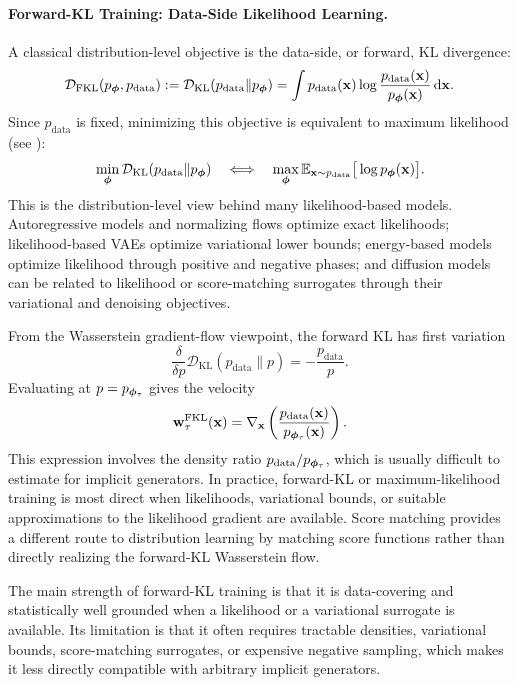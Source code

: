 \paragraph{Forward-KL Training: Data-Side Likelihood Learning.}
A classical distribution-level objective is the data-side, or forward, KL
divergence:
\[
    \mathcal{D}_{\mathrm{FKL}}(p_{{\bm{\phi}}},p_{\mathrm{data}})
    :=
    \mathcal D_{\mathrm{KL}}(p_{\mathrm{data}}\|p_{{\bm{\phi}}})
    =
    \int
    p_{\mathrm{data}}({\mathbf{x}})
    \log
    \frac{p_{\mathrm{data}}({\mathbf{x}})}{p_{{\bm{\phi}}}({\mathbf{x}})}
    \mathop{}\!\mathrm{d}{\mathbf{x}}.
\]
Since $p_{\mathrm{data}}$ is fixed, minimizing this objective is equivalent to
maximum likelihood (see ):
\[
    \min_{{\bm{\phi}}}
    \mathcal D_{\mathrm{KL}}(p_{\mathrm{data}}\|p_{{\bm{\phi}}})
    \quad
    \Longleftrightarrow
    \quad
    \max_{{\bm{\phi}}}
    \mathbb{E}_{{\mathbf{x}}\sim p_{\mathrm{data}}}
    \big[
        \log p_{{\bm{\phi}}}({\mathbf{x}})
    \big].
\]
This is the distribution-level view behind many likelihood-based models.
Autoregressive models and normalizing flows optimize exact likelihoods;
likelihood-based VAEs optimize variational lower bounds; energy-based models
optimize likelihood through positive and negative phases; and diffusion models
can be related to likelihood or score-matching surrogates through their
variational and denoising objectives.

From the Wasserstein gradient-flow viewpoint, the forward KL has first
variation
\[
    \frac{\delta}{\delta p}
    \mathcal D_{\mathrm{KL}}(p_{\mathrm{data}}\|p)
    =
    -
    \frac{p_{\mathrm{data}}}{p}.
\]
Evaluating at $p=p_{{\bm{\phi}}_\tau}$ gives the velocity
\[
    {\mathbf{w}}_\tau^{\mathrm{FKL}}({\mathbf{x}})
    =
    \nabla_{{\mathbf{x}}}
    \left(
        \frac{p_{\mathrm{data}}({\mathbf{x}})}
             {p_{{\bm{\phi}}_\tau}({\mathbf{x}})}
    \right).
\]
This expression involves the density ratio
$p_{\mathrm{data}}/p_{{\bm{\phi}}_\tau}$, which is usually difficult to estimate
for implicit generators. In practice, forward-KL or maximum-likelihood
training is most direct when likelihoods, variational bounds, or suitable
approximations to the likelihood gradient are available. Score matching
provides a different route to distribution learning by matching score
functions rather than directly realizing the forward-KL Wasserstein flow.

The main strength of forward-KL training is that it is data-covering and
statistically well grounded when a likelihood or a variational surrogate is
available.  Its limitation is that it often requires tractable densities,
variational bounds, score-matching surrogates, or expensive negative sampling,
which makes it less directly compatible with arbitrary implicit generators.

